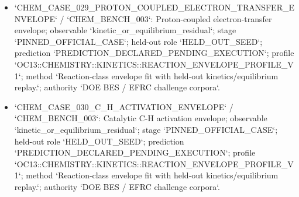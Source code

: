 \begin{itemize}
\item `CHEM\_CASE\_029\_PROTON\_COUPLED\_ELECTRON\_TRANSFER\_ENVELOPE` / `CHEM\_BENCH\_003`: Proton-coupled electron-transfer envelope; observable `kinetic\_or\_equilibrium\_residual`; stage `PINNED\_OFFICIAL\_CASE`; held-out role `HELD\_OUT\_SEED`; prediction `PREDICTION\_DECLARED\_PENDING\_EXECUTION`; profile `OC13::CHEMISTRY::KINETICS::REACTION\_ENVELOPE\_PROFILE\_V1`; method `Reaction-class envelope fit with held-out kinetics/equilibrium replay.`; authority `DOE BES / EFRC challenge corpora`.
\item `CHEM\_CASE\_030\_C\_H\_ACTIVATION\_ENVELOPE` / `CHEM\_BENCH\_003`: Catalytic C-H activation envelope; observable `kinetic\_or\_equilibrium\_residual`; stage `PINNED\_OFFICIAL\_CASE`; held-out role `HELD\_OUT\_SEED`; prediction `PREDICTION\_DECLARED\_PENDING\_EXECUTION`; profile `OC13::CHEMISTRY::KINETICS::REACTION\_ENVELOPE\_PROFILE\_V1`; method `Reaction-class envelope fit with held-out kinetics/equilibrium replay.`; authority `DOE BES / EFRC challenge corpora`.
\end{itemize}

